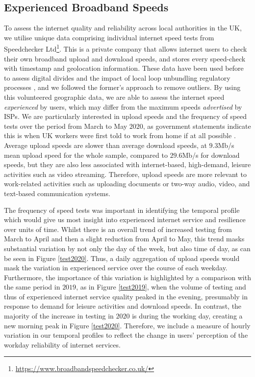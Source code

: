 \documentclass[Royal,times,sageh]{sagej}
\begin{document}
\hypertarget{sec:3.2}{%
\subsection{Experienced Broadband Speeds}\label{sec:3.2}}

To assess the internet quality and reliability across local authorities
in the UK, we utilise unique data comprising individual internet speed
tests from Speedchecker Ltd\footnote{\url{https://www.broadbandspeedchecker.co.uk/}}.
This is a private company that allows internet users to check their own
broadband upload and download speeds, and stores every speed-check with
timestamp and geolocation information. These data have been used before
to assess digital divides \citep{riddlesden2014broadband} and the impact
of local loop unbundling regulatory processes
\citep{nardotto2015unbundling}, and we followed the former's approach to
remove outliers. By using this volunteered geographic data, we are able
to assess the internet speed \emph{experienced} by users, which may
differ from the maximum speeds \emph{advertised} by ISPs. We are
particularly interested in upload speeds and the frequency of speed
tests over the period from March to May \(2020\), as government
statements indicate this is when UK workers were first told to work from
home if at all possible \citep{GovUK2020}. Average upload speeds are
slower than average download speeds, at \(9.3\)Mb/s mean upload speed
for the whole sample, compared to \(29.6\)Mb/s for download speeds, but
they are also less associated with internet-based, high-demand, leisure
activities such as video streaming. Therefore, upload speeds are more
relevant to work-related activities such as uploading documents or
two-way audio, video, and text-based communication systems.

The frequency of speed tests was important in identifying the temporal
profile which would give us most insight into experienced internet
service and resilience over units of time. Whilst there is an overall
trend of increased testing from March to April and then a slight
reduction from April to May, this trend masks substantial variation by
not only the day of the week, but also time of day, as can be seen in
Figure \ref{test2020}. Thus, a daily aggregation of upload speeds would
mask the variation in experienced service over the course of each
weekday. Furthermore, the importance of this variation is highlighted by
a comparison with the same period in \(2019\), as in Figure
\ref{test2019}, when the volume of testing and thus of experienced
internet service quality peaked in the evening, presumably in response
to demand for leisure activities and download speeds. In contrast, the
majority of the increase in testing in \(2020\) is during the working
day, creating a new morning peak in Figure \ref{test2020}. Therefore, we
include a measure of hourly variation in our temporal profiles to
reflect the change in users' perception of the workday reliability of
internet services.
\end{document}
